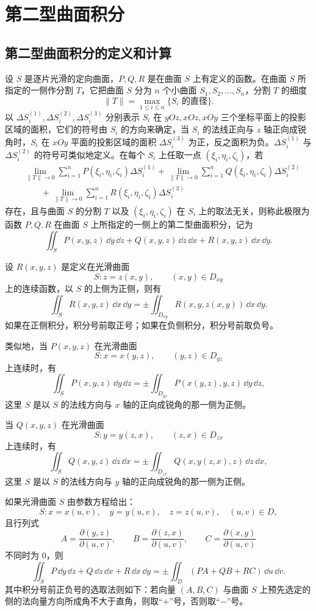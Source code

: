 \section{第二型曲面积分}

\subsection{第二型曲面积分的定义和计算}

设 $S$ 是逐片光滑的定向曲面，$P,Q,R$ 是在曲面 $S$ 上有定义的函数。在曲面 $S$ 所指定的一侧作分割 $T$，它把曲面 $S$ 分为 $n$ 个小曲面 $S_1,S_2,\ldots,S_n$，分割 $T$ 的细度
\[
  \|T\|=\max_{1\le i\le n}\{S_i\text{ 的直径}\}.
\]
以 $\Delta S_i^{(1)},\Delta S_i^{(2)},\Delta S_i^{(3)}$ 分别表示 $S_i$ 在 $yOz,xOz,xOy$ 三个坐标平面上的投影区域的面积，它们的符号由 $S_i$ 的方向来确定，当 $S_i$ 的法线正向与 $z$ 轴正向成锐角时，$S_i$ 在 $xOy$ 平面的投影区域的面积 $\Delta S_i^{(3)}$ 为正，反之面积为负。$\Delta S_i^{(1)}$ 与 $\Delta S_i^{(2)}$ 的符号可类似地定义。在每个 $S_i$ 上任取一点 $(\xi_i,\eta_i,\zeta_i)$，若
\begin{align*}
&\lim_{\|T\|\to0}\sum_{i=1}^nP(\xi_i,\eta_i,\zeta_i)\Delta S_i^{(1)}
+\lim_{\|T\|\to0}\sum_{i=1}^nQ(\xi_i,\eta_i,\zeta_i)\Delta S_i^{(2)}\\
&\qquad+\lim_{\|T\|\to0}\sum_{i=1}^nR(\xi_i,\eta_i,\zeta_i)\Delta S_i^{(3)}
\end{align*}
存在，且与曲面 $S$ 的分割 $T$ 以及 $(\xi_i,\eta_i,\zeta_i)$ 在 $S_i$ 上的取法无关，则称此极限为函数 $P,Q,R$ 在曲面 $S$ 上所指定的一侧上的第二型曲面积分，记为
\[
  \iint_S P(x,y,z)\,\dd y\,\dd z+Q(x,y,z)\,\dd z\,\dd x+R(x,y,z)\,\dd x\,\dd y.
\]

设 $R(x,y,z)$ 是定义在光滑曲面
\[
  S:z=z(x,y),\qquad (x,y)\in D_{xy}
\]
上的连续函数，以 $S$ 的上侧为正侧，则有
\[
  \iint_S R(x,y,z)\,\dd x\,\dd y
  =\pm\iint_{D_{xy}}R(x,y,z(x,y))\,\dd x\,\dd y.
\]
如果在正侧积分，积分号前取正号；如果在负侧积分，积分号前取负号。

类似地，当 $P(x,y,z)$ 在光滑曲面
\[
  S:x=x(y,z),\qquad (y,z)\in D_{yz}
\]
上连续时，有
\[
  \iint_S P(x,y,z)\,\dd y\,\dd z
  =\pm\iint_{D_{yz}}P(x(y,z),y,z)\,\dd y\,\dd z,
\]
这里 $S$ 是以 $S$ 的法线方向与 $x$ 轴的正向成锐角的那一侧为正侧。

当 $Q(x,y,z)$ 在光滑曲面
\[
  S:y=y(z,x),\qquad (z,x)\in D_{zx}
\]
上连续时，有
\[
  \iint_S Q(x,y,z)\,\dd z\,\dd x
  =\pm\iint_{D_{zx}}Q(x,y(z,x),z)\,\dd z\,\dd x,
\]
这里 $S$ 是以 $S$ 的法线方向与 $y$ 轴的正向成锐角的那一侧为正侧。

如果光滑曲面 $S$ 由参数方程给出：
\[
  S:x=x(u,v),\quad y=y(u,v),\quad z=z(u,v),\quad (u,v)\in D,
\]
且行列式
\[
  A=\frac{\partial(y,z)}{\partial(u,v)},\qquad
  B=\frac{\partial(z,x)}{\partial(u,v)},\qquad
  C=\frac{\partial(x,y)}{\partial(u,v)}
\]
不同时为 0，则
\begin{equation}
  \iint_S P\,\dd y\,\dd z+Q\,\dd z\,\dd x+R\,\dd x\,\dd y
  =\pm\iint_D(PA+QB+RC)\,\dd u\,\dd v.
  \tag{25.3}
\end{equation}
其中积分号前正负号的选取法则如下：若向量 $(A,B,C)$ 与曲面 $S$ 上预先选定的侧的法向量方向所成角不大于直角，则取“$+$”号，否则取“$-$”号。

